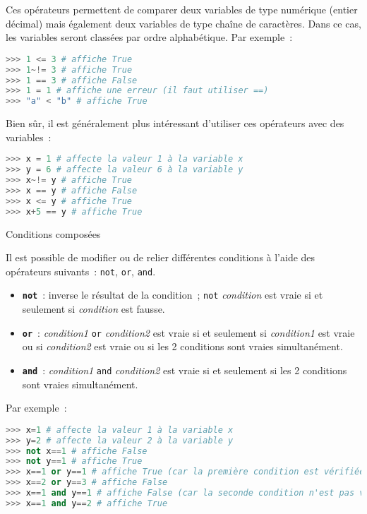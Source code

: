 Ces opérateurs permettent de comparer deux variables de type numérique (entier décimal) mais également deux variables de type \og chaîne de caractères\fg{}. Dans ce cas, les variables seront classées par ordre alphabétique.
\newpar
Par exemple~:
 \begin{lstlisting}[language=Python]
>>> 1 <= 3 # affiche True
>>> 1~!= 3 # affiche True
>>> 1 == 3 # affiche False
>>> 1 = 1 # affiche une erreur (il faut utiliser ==)
>>> "a" < "b" # affiche True
\end{lstlisting}
Bien sûr, il est généralement plus intéressant d'utiliser ces opérateurs avec des variables~:
 \begin{lstlisting}[language=Python]
>>> x = 1 # affecte la valeur 1 à la variable x
>>> y = 6 # affecte la valeur 6 à la variable y
>>> x~!= y # affiche True
>>> x == y # affiche False
>>> x <= y # affiche True
>>> x+5 == y # affiche True
\end{lstlisting}
\begin{h3} Conditions composées\end{h3}
Il est possible de modifier ou de relier différentes conditions à l'aide des opérateurs suivants~: \texttt{not}, \texttt{or}, \texttt{and}.
\begin{itemize}
     \item
     \textbf{\texttt{not}}~: inverse le résultat de la condition~; \texttt{not} \textit{condition} est vraie si et seulement si \textit{condition} est fausse.
     \item
     \textbf{\texttt{or}}~: \textit{condition1} \texttt{or} \textit{condition2} est vraie si et seulement si \textit{condition1} est vraie ou si \textit{condition2} est vraie ou si les 2 conditions sont vraies simultanément.
     \item
     \textbf{\texttt{and}}~: \textit{condition1} \texttt{and} \textit{condition2} est vraie si et seulement si les 2 conditions sont vraies simultanément.
\end{itemize}
\newpar
Par exemple~:
\begin{lstlisting}[language=Python]
>>> x=1 # affecte la valeur 1 à la variable x
>>> y=2 # affecte la valeur 2 à la variable y
>>> not x==1 # affiche False
>>> not y==1 # affiche True
>>> x==1 or y==1 # affiche True (car la première condition est vérifiée)
>>> x==2 or y==3 # affiche False
>>> x==1 and y==1 # affiche False (car la seconde condition n'est pas vérifiée)
>>> x==1 and y==2 # affiche True
\end{lstlisting}
